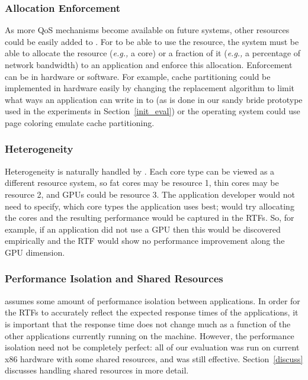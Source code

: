 \subsubsection{Allocation Enforcement}

As more QoS mechanisms become available on future systems, other resources could be easily added to \pacora. For \pacora to be able to use the resource, the system must be able to allocate the resource (\emph{e.g.,} a core) or a fraction of it (\emph{e.g.,} a percentage of network bandwidth) to an application and enforce this allocation.  Enforcement can be in hardware or software.  For example, cache partitioning could be implemented in hardware easily by changing the replacement algorithm to limit what ways an application can write in to (as is done in our sandy bride prototype used in the experiments in Section~\ref{init_eval}) or the operating system could use page coloring emulate cache partitioning. 

\subsubsection{Heterogeneity}

Heterogeneity is naturally handled by \pacora.  Each core type can be viewed as a different resource system, so fat cores may be resource 1, thin cores may be resource 2, and GPUs could be resource 3.  The application developer would not need to specify, which core types the application uses best; \pacora would try allocating the cores and the resulting performance would be captured in the RTFs.  So, for example, if an application did not use a GPU then this would be discovered empirically and the RTF would show no performance improvement along the GPU dimension.  

\subsubsection{Performance Isolation and Shared Resources}

\pacora assumes some amount of performance isolation between
applications.  In order for the RTFs to accurately reflect the
expected response times of the applications, it is important that the
response time does not change much as a function of the other
applications currently running on the machine.  However, the
performance isolation need not be completely perfect: all of our
evaluation was run on current x86 hardware with some shared resources,
and \pacora was still effective. Section~\ref{discuss} discusses
handling shared resources in more detail.


